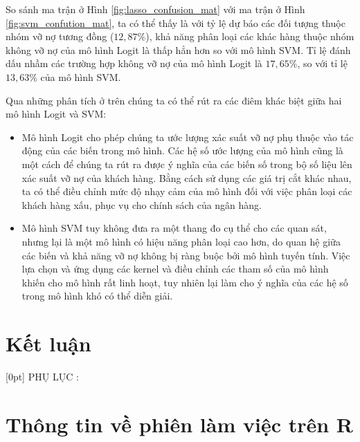 \documentclass[a4paper]{report}\usepackage[]{graphicx}\usepackage[]{color}
\begin{document}
So sánh ma trận ở Hình \ref{fig:lasso_confusion_mat} với ma trận ở Hình \ref{fig:svm_confution_mat}, ta có thể thấy là với tỷ lệ dự báo các đối tượng thuộc nhóm vỡ nợ tương đồng ($12,87\%$), khả năng phân loại các khác hàng thuộc nhóm không vỡ nợ của mô hình Logit là thấp hẳn hơn so với mô hình SVM. Tỉ lệ đánh dấu nhầm các trường hợp không vỡ nợ của mô hình Logit là $17,65\%$, so với tỉ lệ $13,63\%$ của mô hình SVM.

Qua những phân tích ở trên chúng ta có thể rút ra các điêm khác biệt giữa hai mô hình Logit và SVM:
\begin{itemize}
  \item Mô hình Logit cho phép chúng ta ước lượng xác suất vỡ nợ phụ thuộc vào tác động của các biến trong mô hình. Các hệ số ước lượng của mô hình cũng là một cách để chúng ta rút ra được ý nghĩa của các biến số trong bộ số liệu lên xác suất vỡ nợ của khách hàng. Bằng cách sử dụng các giá trị cắt khác nhau, ta có thể điều chỉnh mức độ nhạy cảm của mô hình đối với việc phân loại các khách hàng xấu, phục vụ cho chính sách của ngân hàng.
  \item Mô hình SVM tuy không đưa ra một thang đo cụ thể cho các quan sát, nhưng lại là một mô hình có hiệu năng phân loại cao hơn, do quan hệ giữa các biến và khả năng vỡ nợ không bị ràng buộc bởi mô hình tuyến tính. Việc lựa chọn và ứng dụng các kernel và điều chỉnh các tham số của mô hình khiến cho mô hình rất linh hoạt, tuy nhiên lại làm cho ý nghĩa của các hệ số trong mô hình khó có thể diễn giải.
\end{itemize}


\chapter{Kết luận}




\appendix
{}[0pt]{\bfseries}
  {\color{blue}PHỤ LỤC \thecontentslabel:\quad}
  {}{\contentspage}
  

\chapter{Thông tin về phiên làm việc trên R}
\end{document}
